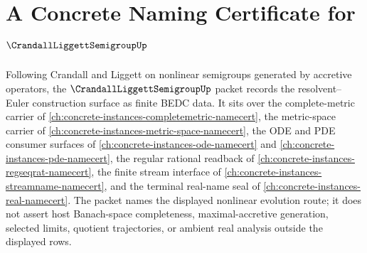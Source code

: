 \chapter{A Concrete Naming Certificate for $\CrandallLiggettSemigroupUp$}
\label{ch:concrete-instances-crandall-liggett-semigroup-namecert}

Following Crandall and Liggett on nonlinear semigroups generated by accretive operators, the $\CrandallLiggettSemigroupUp$ packet records the resolvent--Euler construction surface as finite BEDC data. It sits over the complete-metric carrier of \autoref{ch:concrete-instances-completemetric-namecert}, the metric-space carrier of \autoref{ch:concrete-instances-metric-space-namecert}, the ODE and PDE consumer surfaces of \autoref{ch:concrete-instances-ode-namecert} and \autoref{ch:concrete-instances-pde-namecert}, the regular rational readback of \autoref{ch:concrete-instances-regseqrat-namecert}, the finite stream interface of \autoref{ch:concrete-instances-streamname-namecert}, and the terminal real-name seal of \autoref{ch:concrete-instances-real-namecert}. The packet names the displayed nonlinear evolution route; it does not assert host Banach-space completeness, maximal-accretive generation, selected limits, quotient trajectories, or ambient real analysis outside the displayed rows.

